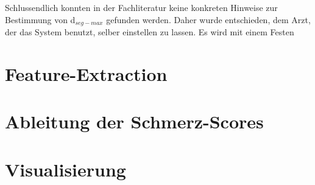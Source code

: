 Schlussendlich konnten in der Fachliteratur keine konkreten Hinweise zur Bestimmung von d$_{seg-max}$ gefunden werden. Daher wurde entschieden, dem Arzt, der das System benutzt, selber einstellen zu lassen. Es wird mit einem Festen 

\section{Feature-Extraction}
\section{Ableitung der Schmerz-Scores}
\section{Visualisierung}